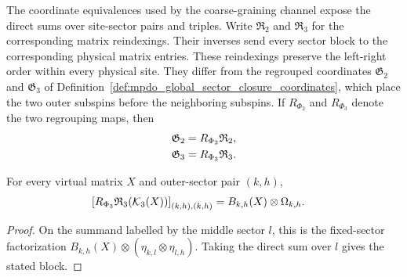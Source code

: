 \begin{definition}
    \label{def:mpdo_physical_sector_closure_coordinates}
    \leanok
    The coordinate equivalences used by the coarse-graining channel expose
    the direct sums over site-sector pairs and triples. Write
    $\mathfrak R_2$ and $\mathfrak R_3$ for the corresponding matrix
    reindexings. Their inverses send every sector block to the corresponding
    physical matrix entries. These reindexings preserve the left-right order
    within every physical site. They differ from the regrouped coordinates
    $\mathfrak G_2$ and $\mathfrak G_3$ of
    Definition~\ref{def:mpdo_global_sector_closure_coordinates}, which place
    the two outer subspins before the neighboring subspins. If
    $R_{\Phi_2}$ and $R_{\Phi_3}$ denote the two regrouping maps, then
    \begin{align}
        \mathfrak G_2 & =R_{\Phi_2}\mathfrak R_2,
        \notag                                    \\
        \mathfrak G_3 & =R_{\Phi_3}\mathfrak R_3.
        \notag
    \end{align}
\end{definition}

\begin{lemma}
    \label{thm:mpdo_regrouped_three_site_closure_block}
    \leanok
    For every virtual matrix $X$ and outer-sector pair $(k,h)$,
    \begin{align}
        \left[R_{\Phi_3}\mathfrak R_3(\mathcal K_3(X))\right]_{(k,h),(k,h)}
         & =B_{k,h}(X)\otimes\Omega_{k,h}.
        \notag
    \end{align}
\end{lemma}

\begin{proof}
    \leanok
    On the summand labelled by the middle sector $l$, this is the fixed-sector
    factorization
    $B_{k,h}(X)\otimes(\eta_{k,l}\otimes\eta_{l,h})$.
    Taking the direct sum over $l$ gives the stated block.
\end{proof}

